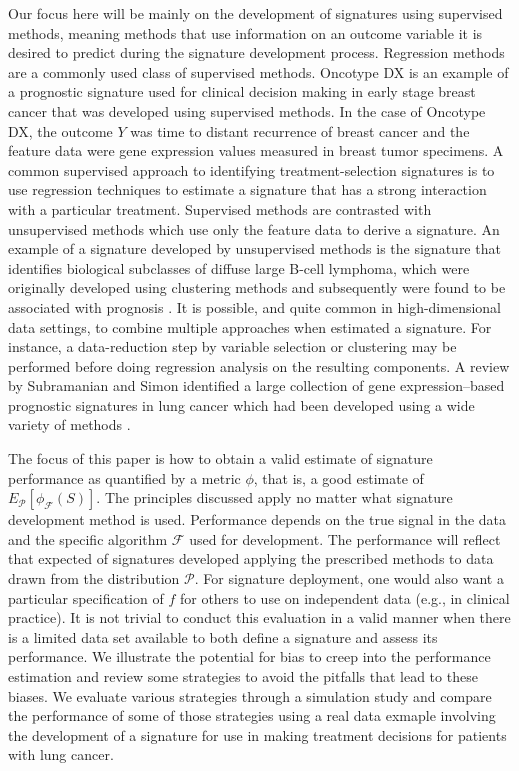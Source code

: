 \documentclass[11pt,]{article}
\begin{document}
Our focus here will be mainly on the development of signatures using
supervised methods, meaning methods that use information on an outcome
variable it is desired to predict during the signature development
process. Regression methods are a commonly used class of supervised
methods. Oncotype DX \citep{paik2004multigene} is an example of a
prognostic signature used for clinical decision making in early stage
breast cancer that was developed using supervised methods. In the case
of Oncotype DX, the outcome \(Y\) was time to distant recurrence of
breast cancer and the feature data were gene expression values measured
in breast tumor specimens. A common supervised approach to identifying
treatment-selection signatures is to use regression techniques to
estimate a signature that has a strong interaction with a particular
treatment. Supervised methods are contrasted with unsupervised methods
which use only the feature data to derive a signature. An example of a
signature developed by unsupervised methods is the signature that
identifies biological subclasses of diffuse large B-cell lymphoma, which
were originally developed using clustering methods and subsequently were
found to be associated with prognosis \citep{alizadeh2000distinct}. It
is possible, and quite common in high-dimensional data settings, to
combine multiple approaches when estimated a signature. For instance, a
data-reduction step by variable selection or clustering may be performed
before doing regression analysis on the resulting components. A review
by Subramanian and Simon identified a large collection of gene
expression--based prognostic signatures in lung cancer which had been
developed using a wide variety of methods \citep{subramanian2010gene}.

The focus of this paper is how to obtain a valid estimate of signature
performance as quantified by a metric \(\phi\), that is, a good estimate
of \(E_\mathcal{P}[\phi_\mathcal{F}(S)]\). The principles discussed
apply no matter what signature development method is used. Performance
depends on the true signal in the data and the specific algorithm
\(\mathcal{F}\) used for development. The performance will reflect that
expected of signatures developed applying the prescribed methods to data
drawn from the distribution \(\mathcal{P}\). For signature deployment,
one would also want a particular specification of \(f\) for others to
use on independent data (e.g., in clinical practice). It is not trivial
to conduct this evaluation in a valid manner when there is a limited
data set available to both define a signature and assess its
performance. We illustrate the potential for bias to creep into the
performance estimation and review some strategies to avoid the pitfalls
that lead to these biases. We evaluate various strategies through a
simulation study and compare the performance of some of those strategies
using a real data exmaple involving the development of a signature for
use in making treatment decisions for patients with lung cancer.
\end{document}

